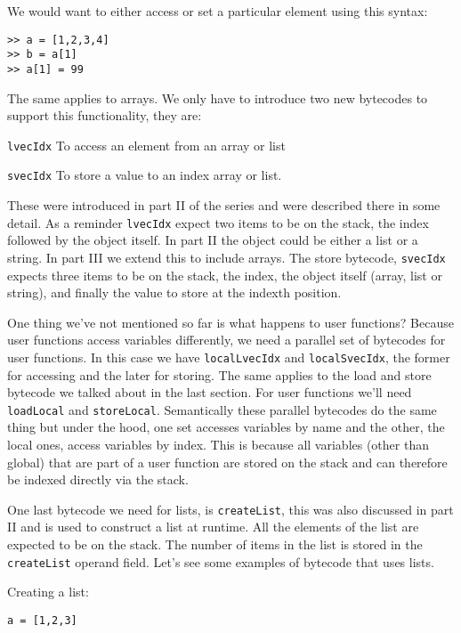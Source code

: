 We would want to either access or set a particular element using this syntax:

\begin{lstlisting}
>> a = [1,2,3,4]
>> b = a[1]
>> a[1] = 99
\end{lstlisting}

The same applies to arrays. We only have to introduce two new bytecodes to support this functionality, they are:

{\tt lvecIdx} To access an element from an array or list

{\tt svecIdx} To store a value to an index array or list.

These were introduced in part II of the series and were described there in some detail. As a reminder {\tt lvecIdx} expect two items to be on the stack, the index followed by the object itself. In part II the object could be either a list or a string. In part III we extend this to include arrays. The store bytecode, {\tt svecIdx}  expects three items to be on the stack, the index, the object itself (array, list or string), and finally the value to store at the indexth position.

One thing we've not mentioned so far is what happens to user functions? Because user functions access variables differently, we need a parallel set of bytecodes for user functions. In this case we have {\tt localLvecIdx} and {\tt localSvecIdx}, the former for accessing and the later for storing. The same applies to the load and store bytecode we talked about in the last section. For user functions we'll need {\tt loadLocal} and {\tt storeLocal}. Semantically these parallel bytecodes do the same thing but under the hood, one set accesses variables by name and the other, the local ones, access variables by index. This is because all variables (other than global) that are part of a user function are stored on the stack and can therefore be indexed directly via the stack.

One last bytecode we need for lists, is {\tt createList}, this was also discussed in part II and is used to construct a list at runtime. All the elements of the list are expected to be on the stack. The number of items in the list is stored in the {\tt createList} operand field. Let's see some examples of bytecode that uses lists.

Creating a list:

\begin{lstlisting}
a = [1,2,3]
\end{lstlisting}

